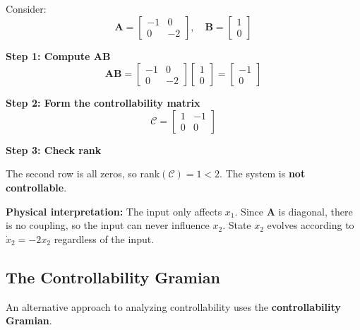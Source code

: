\begin{example}
\label{ex:uncontrollable}
Consider:
\begin{equation}
\mathbf{A} = \begin{bmatrix} -1 & 0 \\ 0 & -2 \end{bmatrix}, \quad \mathbf{B} = \begin{bmatrix} 1 \\ 0 \end{bmatrix}
\end{equation}

\textbf{Step 1: Compute $\mathbf{A}\mathbf{B}$}
\begin{equation}
\mathbf{A}\mathbf{B} = \begin{bmatrix} -1 & 0 \\ 0 & -2 \end{bmatrix}\begin{bmatrix} 1 \\ 0 \end{bmatrix} = \begin{bmatrix} -1 \\ 0 \end{bmatrix}
\end{equation}

\textbf{Step 2: Form the controllability matrix}
\begin{equation}
\mathcal{C} = \begin{bmatrix} 1 & -1 \\ 0 & 0 \end{bmatrix}
\end{equation}

\textbf{Step 3: Check rank}

The second row is all zeros, so rank$(\mathcal{C}) = 1 < 2$. The system is \textbf{not controllable}.

\textbf{Physical interpretation:} The input only affects $x_1$. Since $\mathbf{A}$ is diagonal, there is no coupling, so the input can never influence $x_2$. State $x_2$ evolves according to $\dot{x}_2 = -2x_2$ regardless of the input.
\end{example}

\subsection{The Controllability Gramian}

An alternative approach to analyzing controllability uses the \textbf{controllability Gramian}.

